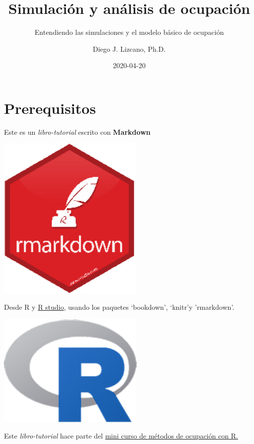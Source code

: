 \documentclass[
]{book}
\title{Simulación y análisis de ocupación}
\subtitle{Entendiendo las simulaciones y el modelo básico de ocupación}
\author{Diego J. Lizcano, Ph.D.}
\date{2020-04-20}
\begin{document}
\maketitle

{
\hypersetup{linkcolor=}
\setcounter{tocdepth}{1}
\tableofcontents
}
\hypertarget{prerequisitos}{%
\chapter{Prerequisitos}\label{prerequisitos}}

Este es un \emph{libro-tutorial} escrito con \textbf{Markdown}

\begin{flushleft}\includegraphics[width=2.78in]{images/rmd} \end{flushleft}

Desde R y \href{https://www.rstudio.com/}{R studio}, usando los paquetes `bookdown', `knitr'y 'rmarkdown'.

\begin{flushleft}\includegraphics[width=2.78in]{images/R} \end{flushleft}

Este \emph{libro-tutorial} hace parte del \href{http://dlizcano.github.io/2016/06/24/Abundancia-y-metodos-de-ocupacion.html}{mini curso de métodos de ocupación con R.}
\end{document}
